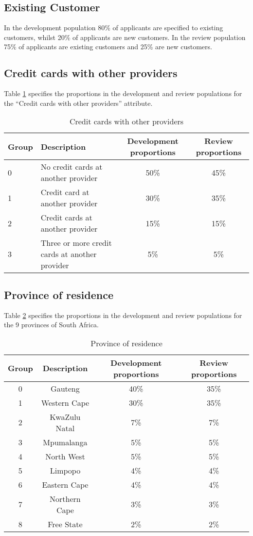 \documentclass{article}
\theoremstyle{def}
\begin{document}
\subsection{Existing Customer}

In the development population 80\% of applicants are specified to existing customers, whilst 20\% of applicants are new customers. In the review population 75\% of applicants are existing customers and 25\% are new customers.

\subsection{Credit cards with other providers}

Table \ref{CCOth_unstablechange} specifies the proportions in the development and review populations for the ``Credit cards with other providers'' attribute.
\begin{table}[H]%
\caption{Credit cards with other providers}
\label{CCOth_unstablechange}
\centering
\small
\begin{tabular}{llcc}
\hline
Group & Description & Development proportions & Review proportions \\
\hline
0 & No credit cards at another provider & 50\%  & 45\%\\
1 & Credit card at another provider & 30\%  & 35\%\\
2 & Credit cards at another provider & 15\% & 15\%\\
3 & Three or more credit cards at another provider & 5\% & 5\%\\
\hline
\end{tabular}
\end{table}  

\subsection{Province of residence}

Table \ref{Prov_unstablechange} specifies the proportions in the development and review populations for the 9 provinces of South Africa.
\begin{table}[H]%
\caption{Province of residence}
\label{Prov_unstablechange}
\centering
\small
\begin{tabular}{cccc}
\hline
Group & Description & Development proportions & Review proportions \\
\hline
0 & Gauteng & 40\%  & 35\%\\
1 & Western Cape & 30\%  & 35\%\\
2 & KwaZulu Natal & 7\% & 7\%\\
3 & Mpumalanga & 5\% & 5\%\\
4 & North West & 5\% & 5\%\\
5 & Limpopo & 4\% & 4\%\\
6 & Eastern Cape & 4\% & 4\%\\
7 & Northern Cape & 3\% & 3\%\\
8 & Free State & 2\% & 2\%\\
\hline
\end{tabular}
\end{table}   
\end{document}
